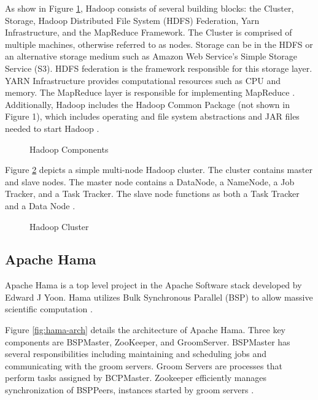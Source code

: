 \documentclass[9pt,twocolumn,twoside]{../../styles/osajnl}
\begin{document}
As show in Figure \ref{fig:hadoop-components}, Hadoop consists of several building blocks: the Cluster, Storage, Hadoop Distributed File System (HDFS) Federation, Yarn Infrastructure, and the MapReduce Framework.  The Cluster is comprised of multiple machines, otherwise referred to as nodes.  Storage can be in the HDFS or an alternative storage medium such as Amazon Web Service's Simple Storage Service (S3).  HDFS federation is the framework responsible for this storage layer.  YARN Infrastructure provides computational resources such as CPU and memory. The MapReduce layer is responsible for implementing MapReduce \cite{www-hadooparch2}. Additionally, Hadoop includes the Hadoop Common Package (not shown in Figure 1), which includes operating and file system abstractions and JAR files needed to start Hadoop \cite{www-wikihadoop}.

\begin{figure}[htbp]
\centering
{}
\caption{Hadoop Components \cite{www-hadooparch2}}
\label{fig:hadoop-components}
\end{figure}

Figure \ref{fig:hadoop-cluster} depicts a simple multi-node Hadoop cluster. The cluster contains master and slave nodes.  The master node contains a DataNode, a NameNode, a Job Tracker, and a Task Tracker. The slave node functions as both a Task Tracker and a Data Node \cite{www-hadooparch2}.

\begin{figure}[htbp]
\centering
{}
\caption{Hadoop Cluster \cite{www-wikihadoop}}
\label{fig:hadoop-cluster}
\end{figure}



\subsection{Apache Hama}

Apache Hama is a top level project in the Apache Software stack developed by Edward J Yoon.  Hama utilizes  Bulk Synchronous Parallel (BSP) to allow massive scientific computation \cite{www-wikihama}. 

Figure \ref{fig:hama-arch} details the architecture of Apache Hama.  Three key components are BSPMaster, ZooKeeper, and GroomServer. BSPMaster has several responsibilities including maintaining and scheduling jobs and communicating with the groom servers.  Groom Servers are processes that perform tasks assigned by BCPMaster.  Zookeeper efficiently manages synchronization of BSPPeers, instances started by groom servers \cite{www-wikihama}. 
\end{document}
